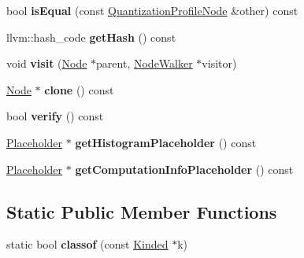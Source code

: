 \begin{DoxyCompactItemize}
bool {\bfseries is\+Equal} (const \hyperlink{classglow_1_1_quantization_profile_node}{Quantization\+Profile\+Node} \&other) const
\item 
\mbox{\label{classglow_1_1_quantization_profile_node_a75eb84218fde8863162b19a104c17c55}} 
llvm\+::hash\+\_\+code {\bfseries get\+Hash} () const
\item 
\mbox{\label{classglow_1_1_quantization_profile_node_af00a3afa27676a1304604a009855cde3}} 
void {\bfseries visit} (\hyperlink{classglow_1_1_node}{Node} $\ast$parent, \hyperlink{classglow_1_1_node_walker}{Node\+Walker} $\ast$visitor)
\item 
\mbox{\label{classglow_1_1_quantization_profile_node_aeb0af99e85fbda5e7cf1155b0c1d5eeb}} 
\hyperlink{classglow_1_1_node}{Node} $\ast$ {\bfseries clone} () const
\item 
\mbox{\label{classglow_1_1_quantization_profile_node_a91b0e6257411fa7692cd7a5a2a8a8dd5}} 
bool {\bfseries verify} () const
\item 
\mbox{\label{classglow_1_1_quantization_profile_node_a0ebdbaff344aae7379511b3d1abd8ca1}} 
\hyperlink{classglow_1_1_placeholder}{Placeholder} $\ast$ {\bfseries get\+Histogram\+Placeholder} () const
\item 
\mbox{\label{classglow_1_1_quantization_profile_node_a3175bd4d2600373b353b7822a76cebc3}} 
\hyperlink{classglow_1_1_placeholder}{Placeholder} $\ast$ {\bfseries get\+Computation\+Info\+Placeholder} () const
\end{DoxyCompactItemize}
\subsection*{Static Public Member Functions}
\begin{DoxyCompactItemize}
\item 
\mbox{\label{classglow_1_1_quantization_profile_node_a46d0abfc7ddff300f0bba9b62d7ee7e7}} 
static bool {\bfseries classof} (const \hyperlink{classglow_1_1_kinded}{Kinded} $\ast$k)
\end{DoxyCompactItemize}

